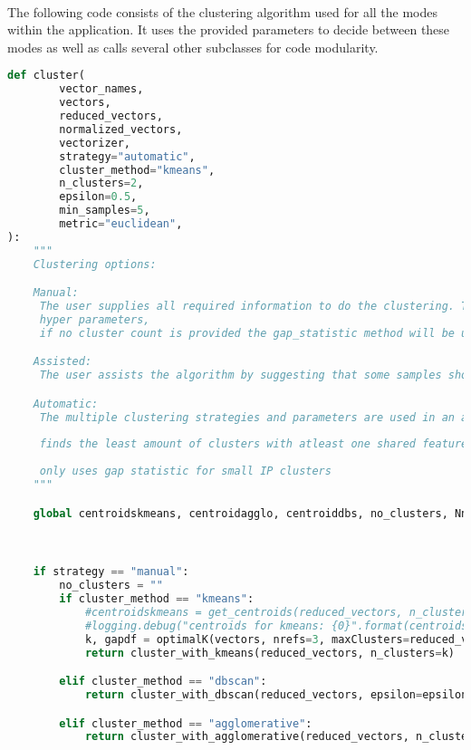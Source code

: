 \paragraph{}The following code consists of the clustering algorithm used for all the modes within the application. It uses the provided parameters to decide between these modes as well as calls several other subclasses for code modularity.
\begin{lstlisting}[language=python]
def cluster(
        vector_names,
        vectors,
        reduced_vectors,
        normalized_vectors,
        vectorizer,
        strategy="automatic",
        cluster_method="kmeans",
        n_clusters=2,
        epsilon=0.5,
        min_samples=5,
        metric="euclidean",
):
    """
    Clustering options:

    Manual:
     The user supplies all required information to do the clustering. This includes the clustering algorithm and
     hyper parameters,
     if no cluster count is provided the gap_statistic method will be used to calculate the optimal cluster count

    Assisted:
     The user assists the algorithm by suggesting that some samples should or should not be clustered together

    Automatic:
     The multiple clustering strategies and parameters are used in an attempt to get the best clusters
     
     finds the least amount of clusters with atleast one shared feature
     
     only uses gap statistic for small IP clusters
    """

    global centroidskmeans, centroidagglo, centroiddbs, no_clusters, Nno_clusters, Ncentroidskmeans



    if strategy == "manual":
        no_clusters = ""
        if cluster_method == "kmeans":
            #centroidskmeans = get_centroids(reduced_vectors, n_clusters=n_clusters)
            #logging.debug("centroids for kmeans: {0}".format(centroidskmeans))
            k, gapdf = optimalK(vectors, nrefs=3, maxClusters=reduced_vectors.shape[0])
            return cluster_with_kmeans(reduced_vectors, n_clusters=k)

        elif cluster_method == "dbscan":
            return cluster_with_dbscan(reduced_vectors, epsilon=epsilon, min_samples=min_samples, metric=metric)

        elif cluster_method == "agglomerative":
            return cluster_with_agglomerative(reduced_vectors, n_clusters=n_clusters, metric=metric)


\end{lstlisting}
